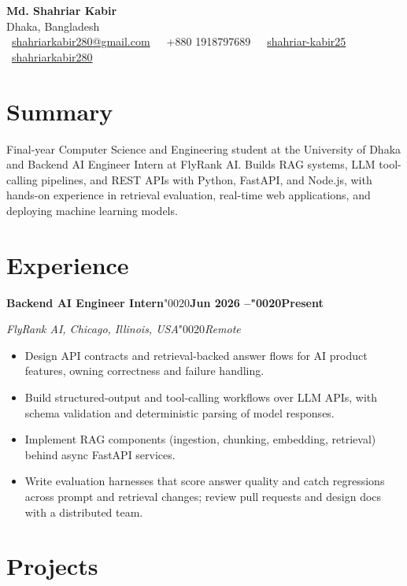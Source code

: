 \documentclass[10pt,a4paper]{article}
\newcommand{\realspace}{\XeTeXglyph\XeTeXcharglyph"0020\relax}
\newcommand{\headingrow}[2]{\textbf{#1}\realspace\hfill\textbf{#2}\par}
\newcommand{\subrow}[2]{\textit{#1}\realspace\hfill\textit{#2}\par\vspace{1pt}}
\newcommand{\sep}{\,\textbar\,}
\begin{document}
\begin{center}
{\LARGE \textbf{Md. Shahriar Kabir}} \\[2pt]
Dhaka, Bangladesh \\
~\href{mailto:shahriarkabir280@gmail.com}{shahriarkabir280@gmail.com} \sep
{}~+880 1918797689 \sep
{}~\href{https://www.linkedin.com/in/shahriar-kabir25}{shahriar-kabir25} \sep
{}~\href{https://github.com/shahriarkabir280}{shahriarkabir280}
\end{center}

\section*{Summary}
Final-year Computer Science and Engineering student at the University of Dhaka and Backend AI Engineer Intern at FlyRank AI.
Builds RAG systems, LLM tool-calling pipelines, and REST APIs with Python, FastAPI, and Node.js, with hands-on experience in
retrieval evaluation, real-time web applications, and deploying machine learning models.

\section*{Experience}
\headingrow{Backend AI Engineer Intern}{Jun 2026 –\realspace Present}
\subrow{FlyRank AI, Chicago, Illinois, USA}{Remote}
\begin{itemize}
  \item Design API contracts and retrieval-backed answer flows for AI product features, owning correctness and failure handling.
  \item Build structured-output and tool-calling workflows over LLM APIs, with schema validation and deterministic parsing of model responses.
  \item Implement RAG components (ingestion, chunking, embedding, retrieval) behind async FastAPI services.
  \item Write evaluation harnesses that score answer quality and catch regressions across prompt and retrieval changes; review pull requests and design docs with a distributed team.
\end{itemize}

\section*{Projects}
\end{document}
